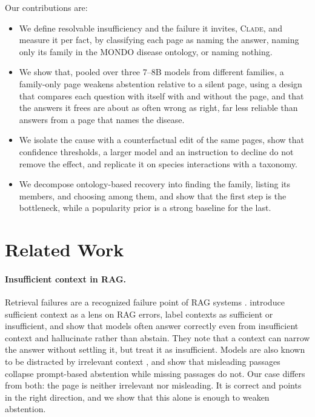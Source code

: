 \documentclass[letterpaper]{article} %
\newcommand{\clade}{\textsc{Clade}}
\begin{document}
Our contributions are:
\begin{itemize}
\item We define resolvable insufficiency and the failure it invites, \clade{},
and measure it per fact, by
classifying each page as naming the answer, naming only its family in the
MONDO disease ontology, or naming nothing.
\item We show that, pooled over three 7--8B models from different families, a
family-only page weakens abstention relative to a silent page, using a design
that compares each question with itself with and without the page, and that
the answers it frees are about as often wrong as right, far less reliable than
answers from a page that names the disease.
\item We isolate the cause with a counterfactual edit of the same pages, show
that confidence thresholds, a larger model and an instruction to decline do not
remove the effect, and replicate it on species interactions with a taxonomy.
\item We decompose ontology-based recovery into finding the family, listing
its members, and choosing among them, and show that the first step is the
bottleneck, while a popularity prior is a strong baseline for the last.
\end{itemize}

\section{Related Work}

\paragraph{Insufficient context in RAG.}
Retrieval failures are a recognized failure point of RAG systems
\citep{barnett2024seven}. \citet{joren2025sufficient} introduce sufficient
context as a lens on RAG errors, label contexts as sufficient or insufficient,
and show that models often answer correctly even from insufficient context and
hallucinate rather than abstain. They note that a context can narrow the answer
without settling it, but treat it as insufficient. Models are also known to be
distracted by irrelevant context \citep{shi2023distracted,yoran2024robust}, and
\citet{setiawan2026misleading} show that misleading passages collapse
prompt-based abstention while missing passages do not. Our case differs from
both: the page is neither irrelevant nor misleading. It is correct and points
in the right direction, and we show that this alone is enough to weaken
abstention.
\end{document}
